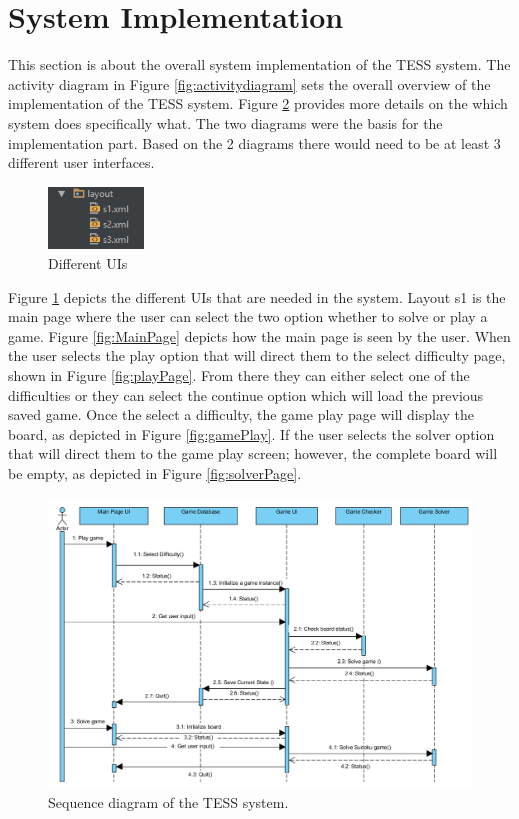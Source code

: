 \documentclass{article}
\begin{document}
\section{System Implementation}
This section is about the overall system implementation of the TESS system. The activity diagram in Figure \ref{fig:activitydiagram} sets the overall overview of the implementation of the TESS system. Figure \ref{fig:sequencediagram} provides more details on the which system does specifically what. The two diagrams were the basis for the implementation part. Based on the 2 diagrams there would need to be at least 3 different user interfaces. 
\begin{figure}\begin{center} \includegraphics[width=1.0in]{./Figure/layout.PNG}\caption{Different UIs}\label{fig:UIs} \end{center}
\end{figure}
Figure \ref{fig:UIs} depicts the different UIs that are needed in the system. Layout s1 is the main page where the user can select the two option whether to solve or play a game. Figure \ref{fig:MainPage} depicts how the main page is seen by the user. When the user selects the play option that will direct them to the select difficulty page, shown in Figure \ref{fig:playPage}. From there they can either select one of the difficulties or they can select the continue option which will load the previous saved game. Once the select a difficulty, the game play page will display the board, as depicted in Figure \ref{fig:gamePlay}. If the user selects the solver option that will direct them to the game play screen; however, the complete board will be empty, as depicted in Figure \ref{fig:solverPage}.
\begin{figure}[h]
	\centering
	\includegraphics[width=5.0in]{./Figure/Sequence_Diagram.PNG}
	\caption{Sequence diagram of the TESS system.\cite{UMLDoc}}
	\label{fig:sequencediagram}
\end{figure}
\end{document}
